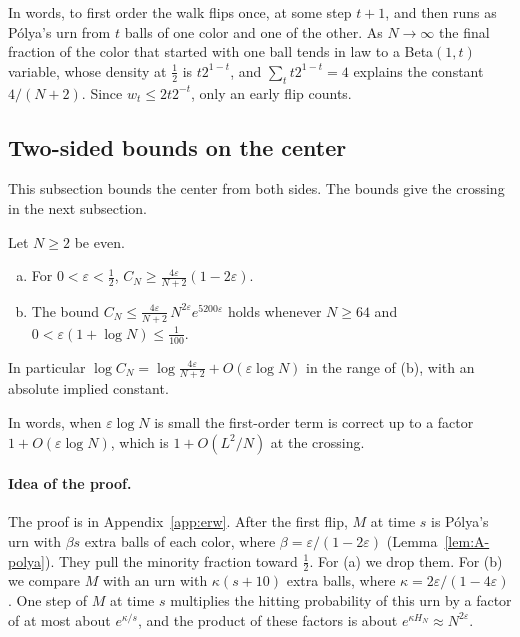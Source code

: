 In words, to first order the walk flips once, at some step $t+1$, and then
runs as P\'olya's urn from $t$ balls of one color and one of the other. As
$N\to\infty$ the final fraction of the color that started with one ball tends
in law to a Beta$(1,t)$ variable, whose density at $\frac12$ is $t2^{1-t}$, and $\sum_tt2^{1-t}=4$ explains the constant
$4/(N+2)$. Since $w_t\le2t2^{-t}$, only an early flip counts.

\subsection{Two-sided bounds on the center}

This subsection bounds the center from both sides. The bounds give the crossing in the next
subsection.

\begin{theorem}\label{thm:erw-bounds}
Let $N\ge2$ be even.
\begin{enumerate}[(a)]
\item For $0<\varepsilon<\frac12$,
$C_N\ge\frac{4\varepsilon}{N+2}(1-2\varepsilon)$.
\item The bound
$C_N\le\frac{4\varepsilon}{N+2}\,N^{2\varepsilon}e^{5200\varepsilon}$ holds
whenever $N\ge64$ and $0<\varepsilon(1+\log N)\le\frac1{100}$.
\end{enumerate}
In particular $\log C_N=\log\frac{4\varepsilon}{N+2}+O(\varepsilon\log N)$
in the range of (b), with an absolute implied constant.
\end{theorem}

In words, when $\varepsilon\log N$ is small the first-order term is correct up to a factor
$1+O(\varepsilon\log N)$, which is $1+O(L^2/N)$ at the crossing.

\paragraph{Idea of the proof.}
The proof is in Appendix~\ref{app:erw}. After the first flip, $M$ at time $s$
is P\'olya's urn with $\beta s$ extra balls of each color, where
$\beta=\varepsilon/(1-2\varepsilon)$ (Lemma~\ref{lem:A-polya}). They pull the
minority fraction toward $\frac12$. For (a) we drop them. For (b) we compare
$M$ with an urn with $\kappa(s+10)$ extra balls, where
$\kappa=2\varepsilon/(1-4\varepsilon)$. One step of $M$ at time $s$
multiplies the hitting probability of this urn by a factor of at most about
$e^{\kappa/s}$, and the product of these factors is about
$e^{\kappa H_N}\approx N^{2\varepsilon}$.

